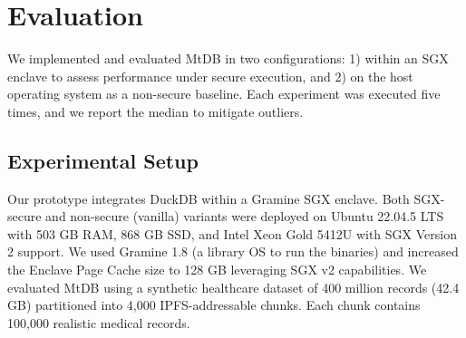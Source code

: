 \documentclass[conference]{IEEEtran}
\newcommand{\ours}{\xspace MtDB\xspace}
\begin{document}
\section{Evaluation}

We implemented and evaluated \ours in two configurations: 1) within an SGX enclave to assess performance under secure execution, and 2) on the host operating system as a non-secure baseline. Each experiment was executed five times, and we report the median to mitigate outliers.

\subsection{Experimental Setup}

Our prototype integrates DuckDB within a Gramine SGX enclave. Both SGX-secure and non-secure (vanilla) variants were deployed on Ubuntu 22.04.5 LTS with 503 GB RAM, 868 GB SSD, and Intel Xeon Gold 5412U with SGX Version 2 support. We used Gramine 1.8 (a library OS to run the binaries) and increased the Enclave Page Cache size to 128 GB leveraging SGX v2 capabilities. We evaluated \ours using a synthetic healthcare dataset of 400 million records (42.4 GB) partitioned into 4,000 IPFS-addressable chunks. Each chunk contains 100,000 realistic medical records.

    
    
\end{document}
